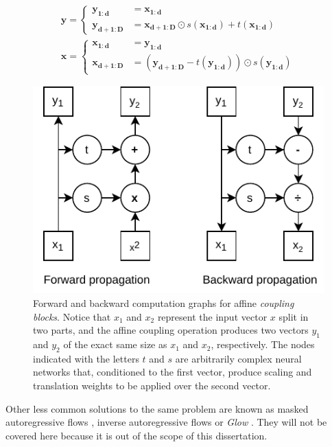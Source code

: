 \begin{equation}
\label{eq:affinecouplingblock}
\begin{gathered}
	 \mathbf{y} = \begin{cases} \mathbf{y_{1: d}} & = \mathbf{x_{1: d}} \\
	\mathbf{y_{d+1: D}} & =\mathbf{x_{d+1: D}} \odot s\left(\mathbf{x_{1: d}}\right)+t\left(\mathbf{x_{1: d}}\right)\end{cases} \\
	\mathbf{x} = \begin{cases}
	\mathbf{x_{1: d}} &=\mathbf{y_{1: d}} \\
	\mathbf{x_{d+1: D}} &=\left(\mathbf{y_{d+1: D}}-t\left(\mathbf{y_{1: d}}\right)\right) \odot s\left(\mathbf{y_{1: d}}\right)
	\end{cases}
\end{gathered}
\end{equation}

\begin{figure}
	\centering
	\includegraphics[width=0.7\linewidth]{chapter2/images/affinecouplingblock}
	\caption{Forward and backward computation graphs for affine \textit{coupling blocks}. Notice that $x_1$ and $x_2$ represent the input vector $x$ split in two parts, and the affine coupling operation produces two vectors $y_1$ and $y_2$ of the exact same size as $x_1$ and $x_2$, respectively. The nodes indicated with the letters $t$ and $s$ are arbitrarily complex neural networks that, conditioned to the first vector, produce scaling and translation weights to be applied over the second vector.}
	\label{fig:affinecouplingblock}
\end{figure}


Other less common solutions to the same problem are known as masked autoregressive flows \cite{papamakarios2017}, inverse autoregressive flows \cite{kingma2016} or \textit{Glow} \cite{kingma2018}. They will not be covered here because it is out of the scope of this dissertation. 

